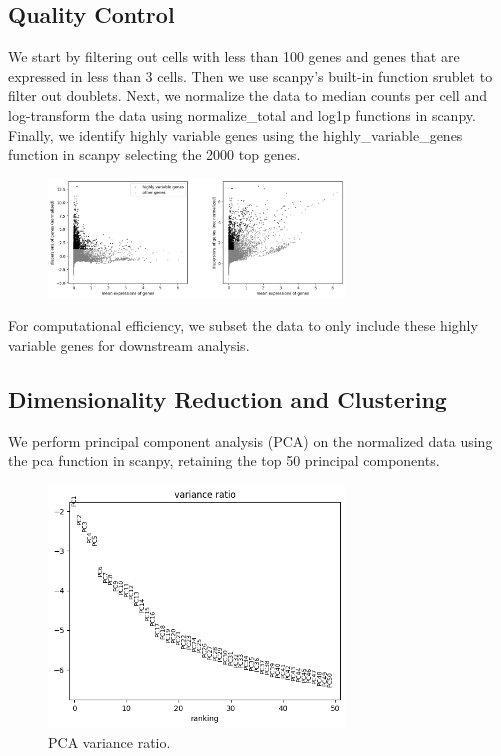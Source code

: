 \documentclass[12pt,letterpaper]{article}
\begin{document}
\subsection{Quality Control}
We start by filtering out cells with less than 100 genes and genes that are
expressed in less than 3 cells. 
Then we use scanpy's built-in function srublet to filter out doublets.
Next, we normalize the data to median counts per cell and log-transform the data using
normalize_total and log1p functions in scanpy.
Finally, we identify highly variable genes using the highly_variable_genes function in scanpy
selecting the 2000 top genes.
\begin{figure}[h!]
	\centering
	\includegraphics[width=0.7\textwidth]{figures/Highly_variable_genes.png}
	\label{fig:clustering}
\end{figure}
For computational efficiency, we subset the data to only include these highly variable genes for downstream analysis.
\subsection{Dimensionality Reduction and Clustering}
We perform principal component analysis (PCA) on the normalized data using the
pca function in scanpy, retaining the top 50 principal components.
\begin{figure}[h!]
	\centering
	\includegraphics[width=0.7\textwidth]{figures/PCA_vatiance_ratio.png}
	\caption{PCA variance ratio.}
	\label{fig:clustering}
\end{figure}
\end{document}

